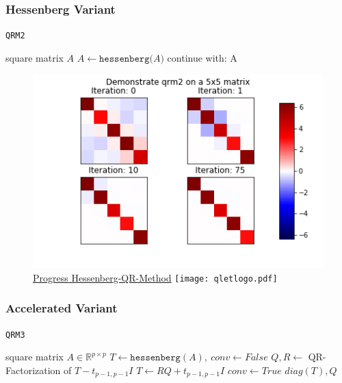 \documentclass[12pt]{article}
\begin{document}
\subsubsection{Hessenberg Variant}


\begin{algorithm}[H]
\caption{\texttt{QRM2}}
\label{qr2-meth}
\begin{algorithmic}
  \Require square matrix $A$
  \State $A \gets \texttt{hessenberg(}A\texttt{)}$
  \State continue with:  A
\end{algorithmic}
\end{algorithm}

\begin{figure}
\begin{center}
\caption{\href {https://github.com/thsis/NIS18/tree/master/media/plots}{Progress Hessenberg-QR-Method}  \protect\texttt{[image: qletlogo.pdf]}}
  \includegraphics[scale=0.6]{../media/plots/qrm2.png}
\end{center}
\end{figure}


\subsubsection{Accelerated Variant}

\begin{algorithm}[H]
\begin{algorithmic}
\caption{\texttt{QRM3}}
\Require square matrix $A \in \mathbb{R}^{p \times p}$
\State $T \gets \texttt{hessenberg}(A),\ conv \gets False$
    \State $Q, R \gets$ QR-Factorization of $T - t_{p-1, p-1} I$
    \State $T \gets RQ + t_{p-1, p-1}I$
        \State $conv \gets True$
    \EndIf
\EndWhile
\Return $diag\left(T\right), Q$
\end{algorithmic}
\end{algorithm}
\end{document}
